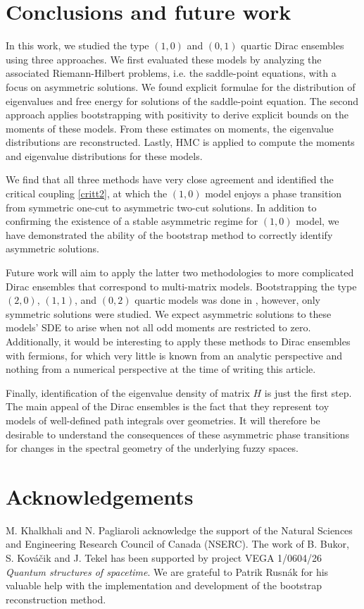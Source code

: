 \documentclass[10pt]{article}
\theoremstyle{plain}
\theoremstyle{definition}
\theoremstyle{plain}
\begin{document}
\section{Conclusions and future work}\label{sec:conclusion}
In this work, we studied the type $(1,0)$ and $(0,1)$ quartic Dirac ensembles using three approaches. We first evaluated these models by analyzing the associated Riemann-Hilbert problems, i.e. the saddle-point equations, with a focus on asymmetric solutions. We found explicit formulae for the distribution of eigenvalues and free energy for solutions of the saddle-point equation. The second approach applies bootstrapping with positivity to derive explicit bounds on the moments of these models. From these estimates on moments, the eigenvalue distributions are reconstructed. Lastly, HMC is applied to compute the moments and eigenvalue distributions for these models.

We find that all three methods have very close agreement and identified the critical coupling \eqref{critt2}, at which the $(1,0)$ model enjoys a phase transition from symmetric one-cut to asymmetric two-cut solutions. In addition to confirming the existence of a stable asymmetric regime for $(1,0)$ model, we have demonstrated the ability of the bootstrap method to correctly identify asymmetric solutions.

Future work will aim to apply the latter two methodologies to more complicated Dirac ensembles that correspond to multi-matrix models. Bootstrapping the type $(2,0)$, $(1,1)$, and $(0,2)$ quartic models was done in \cite{hessam2022bootstrapping}, however, only symmetric solutions were studied. We expect asymmetric solutions to these models' SDE to arise when not all odd moments are restricted to zero. Additionally, it would be interesting to apply these methods to Dirac ensembles with fermions, for which very little is known from an analytic perspective and nothing from a numerical perspective at the time of writing this article.

Finally, identification of the eigenvalue density of matrix $H$ is just the first step. The main appeal of the Dirac ensembles is the fact that they represent toy models of well-defined path integrals over geometries. It will therefore be desirable to understand the consequences of these asymmetric phase transitions for changes in the spectral geometry of the underlying fuzzy spaces.


\section*{Acknowledgements}
M. Khalkhali and N. Pagliaroli acknowledge the support of the Natural Sciences and Engineering Research Council of Canada (NSERC). The work of B. Bukor, S. Kov\'a\v cik and J. Tekel has been supported by project VEGA 1/0604/26 \emph{Quantum structures of spacetime}. We are grateful to Patrik Rusnák for his valuable help with the implementation and development of the bootstrap reconstruction method.
\end{document}
